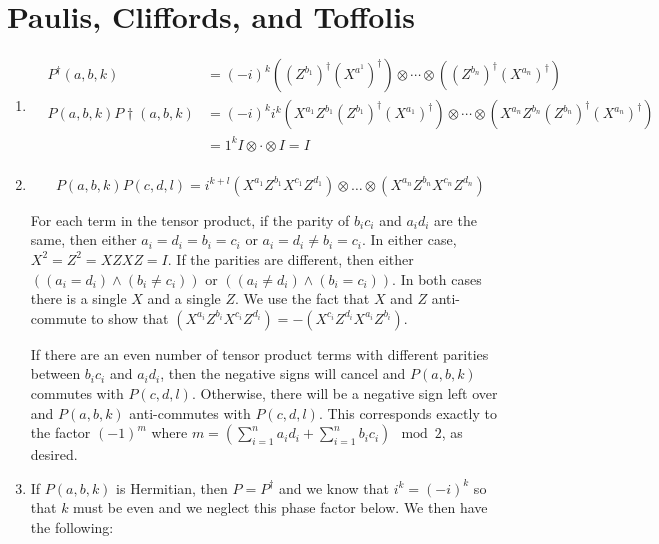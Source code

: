 \documentclass[12pt]{article}
\begin{document}
\pagebreak

\setcounter{section}{1}
\section{Paulis, Cliffords, and Toffolis}

\begin{enumerate}

\item
\begin{eqnarray*}
& P^\dagger(a,b,k) & = (-i)^k((Z^{b_1})^\dagger (X^{a^1})^\dagger) \otimes \cdots \otimes ((Z^{b_n})^\dagger (X^{a_n})^\dagger)\\
& P(a,b,k)P\dagger(a,b,k) & = (-i)^k i^k (X^{a_1}Z^{b_1}(Z^{b_1})^\dagger(X^{a_1})^\dagger)\otimes \cdots \otimes (X^{a_n}Z^{b_n}(Z^{b_n})^\dagger(X^{a_n})^\dagger) \\
& & = 1^k I \otimes \cdot \otimes I = I\\
\end{eqnarray*}

\item
\begin{displaymath}
P(a,b,k)P(c,d,l) = i^{k+l}(X^{a_1}Z^{b_1}X^{c_1}Z^{d_1})\otimes \ldots \otimes (X^{a_n}Z^{b_n}X^{c_n}Z^{d_n})
\end{displaymath}

For each term in the tensor product, if the parity of $b_ic_i$ and $a_id_i$
are the same, then either $a_i = d_i = b_i = c_i$ or $a_i = d_i \ne b_i = c_i$.
In either case,
$X^2 = Z^2 = XZXZ = I$. If the parities are different, then either
$((a_i = d_i) \land (b_i \ne c_i))$ or $((a_i \ne d_i) \land (b_i = c_i))$.
In both cases there is a single $X$ and a single $Z$.
We use the
fact that $X$ and $Z$ anti-commute to show that
$(X^{a_i}Z^{b_i}X^{c_i}Z^{d_i}) = -(X^{c_i}Z^{d_i}X^{a_i}Z^{b_i})$.

If there are an even number of tensor product terms with different parities between
$b_ic_i$ and $a_id_i$, then the negative signs will cancel and
$P(a,b,k)$ commutes with $P(c,d,l)$. Otherwise, there will be a negative sign
left over and $P(a,b,k)$ anti-commutes with $P(c,d,l)$. This corresponds
exactly to the factor $(-1)^m$ where $m = (\sum_{i=1}^n a_id_i + \sum_{i=1}^n b_ic_i) \mod{2}$, as desired.

\item
If $P(a,b,k)$ is Hermitian, then $P = P^\dagger$ and we know that
$i^k = (-i)^k$ so that $k$ must be even and we neglect this phase factor
below. We then have the following:


\end{enumerate}
\end{document}
